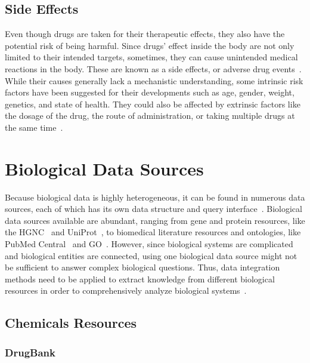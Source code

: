 \subsection{Side Effects}

Even though drugs are taken for their therapeutic effects, they also have the potential risk of being harmful.
Since drugs’ effect inside the body are not only limited to their intended targets, sometimes, they can cause unintended medical reactions in the body.
These are known as a side effects, or adverse drug events~\cite{pourpak_understanding_2008}.
While their causes generally lack a mechanistic understanding, some intrinsic risk factors have been suggested for their developments such as age, gender, weight, genetics, and state of health.
They could also be affected by extrinsic factors like the dosage of the drug, the route of administration, or taking multiple drugs at the same time~\cite{pourpak_understanding_2008}.

\section{Biological Data Sources}

Because biological data is highly heterogeneous, it can be found in numerous data sources, each of which has its own data structure and query interface~\cite{baralis_exploring_2008}.
Biological data sources available are abundant, ranging from gene and protein resources, like the \ac{HGNC}~\cite{baralis_exploring_2008} and UniProt~\cite{noauthor_uniprot:_2019}, to biomedical literature resources and ontologies, like PubMed Central~\cite{roberts_pubmed_2001} and \ac{GO}~\cite{noauthor_gene_2008}.
However, since biological systems are complicated and biological entities are connected, using one biological data source might not be sufficient to answer complex biological questions.
Thus, data integration methods need to be applied to extract knowledge from different biological resources in order to comprehensively analyze biological systems~\cite{baralis_exploring_2008}.

\subsection{Chemicals Resources}

\subsubsection{DrugBank}

